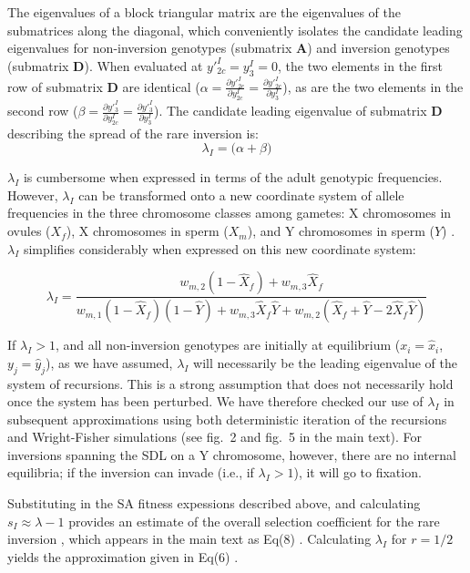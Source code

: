 \documentclass{article}
\newcommand\hl[1]{%
  \bgroup
  \hskip0pt\color{blue!80!black}%
  #1%
  \egroup
}
\begin{document}
\noindent The eigenvalues of a block triangular matrix are the eigenvalues of the submatrices along the diagonal, which conveniently isolates the candidate leading eigenvalues for non-inversion genotypes (submatrix $\mathbf{A}$) and inversion genotypes (submatrix $\mathbf{D}$). When evaluated at $y'^I_{2c} = y^I_{3} = 0$, the two elements in the first row of submatrix $\mathbf{D}$ are identical ($ \alpha = \frac{\partial y'^I_{2c}}{\partial y^I_{2c}} = \frac{\partial y'^I_{2c}}{\partial y^I_{3}}$), as are the two elements in the second row ($\beta = \frac{\partial y'^I_{3}}{\partial y^I_{2c}} = \frac{\partial y'^I_{3}}{\partial y^I_{3}}$). The candidate leading eigenvalue of submatrix $\mathbf{D}$ describing the spread of the rare inversion is:
\begin{equation}
	\lambda_{I} = \big( \alpha + \beta \big)
\end{equation}

\noindent $\lambda_I$ is cumbersome when expressed in terms of the adult genotypic frequencies. However, $\lambda_I$ can be transformed onto a new coordinate system of allele frequencies in the three chromosome classes among gametes: X chromosomes in ovules ($X_f$), X chromosomes in sperm ($X_m$), and Y chromosomes in sperm ($Y$) \citep{Clark1987,Otto2011,Otto2014}. $\lambda_I$ simplifies considerably when expressed on this new coordinate system:

\begin{equation}
	\lambda_I = \frac{w_{m,2}(1 - \hat{X}_f) + w_{m,3} \hat{X}_f} {w_{m,1}(1 - \hat{X}_f)(1 - \hat{Y}) + w_{m,3} \hat{X}_f \hat{Y} + w_{m,2} (\hat{X}_f + \hat{Y} - 2 \hat{X}_f \hat{Y})}
\end{equation}

\noindent If $\lambda_I > 1$, and all non-inversion genotypes are initially at equilibrium ($x_i = \hat{x}_i$, $y_j = \hat{y}_j$), as we have assumed, $\lambda_I$ will necessarily be the leading eigenvalue of the system of recursions. This is a strong assumption that does not necessarily hold once the system has been perturbed. We have therefore checked our use of $\lambda_I$ in subsequent approximations using both deterministic iteration of the recursions and Wright-Fisher simulations (see fig.~2 and fig.~5 in the main text). For inversions spanning the SDL on a Y chromosome, however, there are no internal equilibria; if the inversion can invade (i.e., if $\lambda_I > 1$), it will go to fixation. 

Substituting in the SA fitness expessions described above, and calculating $s_I \approx \lambda - 1$ provides an estimate of the overall selection coefficient for the rare inversion \cite{OttoYong2002}, which appears in the main text as \hl{Eq(8)}. Calculating $\lambda_I$ for $r = 1/2$ yields the approximation given in \hl{Eq(6)}.
\end{document}
